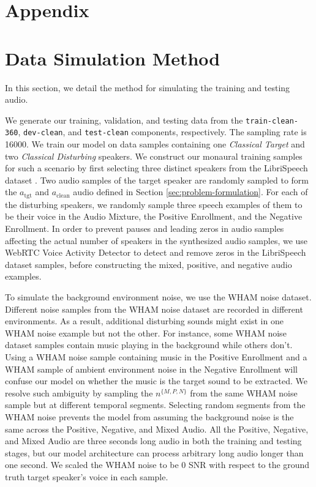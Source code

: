 \newpage
\appendix
\onecolumn
\section*{Appendix}
\section{Data Simulation Method}

In this section, we detail the method for simulating the training and testing audio. 

We generate our training, validation, and testing data from the \texttt{train-clean-360}, \texttt{dev-clean}, and \texttt{test-clean} components, respectively. The sampling rate is 16000.  
We train our model on data samples containing one \textit{Classical Target} and two \textit{Classical Disturbing} speakers. 
We construct our monaural training samples for such a scenario by first selecting three distinct speakers from the LibriSpeech dataset \cite{librispeech}. Two audio samples of the target speaker are randomly sampled to form the $a_{\text{tgt}}$ and $a_{\text{clean}}$ audio defined in Section \ref{sec:problem-formulation}. For each of the disturbing speakers, we randomly sample three speech examples of them to be their voice in the Audio Mixture, the Positive Enrollment, and the Negative Enrollment. In order to prevent pauses and leading zeros in audio samples affecting the actual number of speakers in the synthesized audio samples, we use WebRTC Voice Activity Detector \cite{pywebrtcvad} to detect and remove zeros in the LibriSpeech dataset samples, before constructing the mixed, positive, and negative audio examples. 


To simulate the background environment noise, we use the WHAM noise dataset. Different noise samples from the WHAM noise dataset are recorded in different environments. As a result, additional disturbing sounds might exist in one WHAM noise example but not the other. For instance, some WHAM noise dataset samples contain music playing in the background while others don't. Using a WHAM noise sample containing music in the Positive Enrollment and a WHAM sample of ambient environment noise in the Negative Enrollment will confuse our model on whether the music is the target sound to be extracted. We resolve such ambiguity by sampling the $n^{\{M, P, N\}}$ from the same WHAM noise sample but at different temporal segments. 
Selecting random segments from the WHAM noise prevents the model from assuming the background noise is the same across the Positive, Negative, and Mixed Audio. All the Positive, Negative, and Mixed Audio are three seconds long audio in both the training and testing stages, but our model architecture can process arbitrary long audio longer than one second. We scaled the WHAM noise to be 0 SNR with respect to the ground truth target speaker's voice in each sample. 

